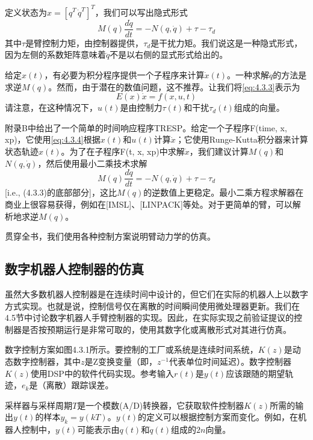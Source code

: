\documentclass[UTF8]{ctexart}
\theoremstyle{definition}
\begin{document}
定义状态为$x = [q^T \, \dot{q}^T]^T$，我们可以写出隐式形式
\begin{equation}\label{eq:4.3.3}
    M(q)\frac{d\dot{q}}{dt} = -N(q, \dot{q}) + \tau - \tau_d
\end{equation}
其中$\tau$是臂控制力矩，由控制器提供，$\tau_d$是干扰力矩。我们说这是一种隐式形式，因为左侧的系数矩阵意味着$\ddot{q}$不是以右侧的显式形式给出的。

给定$x(t)$，有必要为积分程序提供一个子程序来计算$\dot{x}(t)$。一种求解$\ddot{q}$的方法是求逆$M(q)$。然而，由于潜在的数值问题，这不推荐。让我们将\eqref{eq:4.3.3}表示为
\begin{equation}\label{eq:4.3.4}
    E(x)\dot{x} = f(x, u, t)
\end{equation}
请注意，在这种情况下，$u(t)$是由控制力$\tau(t)$和干扰$\tau_d(t)$组成的向量。

附录B中给出了一个简单的时间响应程序TRESP。给定一个子程序F(time, x, xp)，它使用\eqref{eq:4.3.4}根据$x(t)$和$u(t)$计算$\dot{x}$；它使用Runge-Kutta积分器来计算状态轨迹$x(t)$。为了在子程序F(t, x, xp)中求解$\dot{x}$，我们建议计算$M(q)$和$N(q, \dot{q})$，然后使用最小二乘技术求解
\begin{equation}\label{eq:4.3.5}
    M(q)\frac{d\dot{q}}{dt} = -N(q, \dot{q}) + \tau - \tau_d
\end{equation}
[i.e., (4.3.3)的底部部分]，这比$M(q)$的逆数值上更稳定。最小二乘方程求解器在商业上很容易获得，例如在[IMSL]、[LINPACK]等处。对于更简单的臂，可以解析地求逆$M(q)$。

贯穿全书，我们使用各种控制方案说明臂动力学的仿真。

\subsection{数字机器人控制器的仿真}

虽然大多数机器人控制器是在连续时间中设计的，但它们在实际的机器人上以数字方式实现。也就是说，控制信号仅在离散的时间瞬间使用微处理器更新。我们在4.5节中讨论数字机器人手臂控制器的实现。因此，在实际实现之前验证提议的控制器是否按预期运行是非常可取的，使用其数字化或离散形式对其进行仿真。

数字控制方案如图4.3.1所示。要控制的工厂或系统是连续时间系统，$K(z)$是动态数字控制器，其中$z$是Z变换变量（即，$z^{-1}$代表单位时间延迟）。数字控制器$K(z)$使用DSP中的软件代码实现。参考输入$r(t)$是$y(t)$应该跟随的期望轨迹，$e_k$是（离散）跟踪误差。

采样器与采样周期$T$是一个模数(A/D)转换器，它获取软件控制器$K(z)$所需的输出$y(t)$的样本$y_k = y(kT)$。$y(t)$的定义可以根据控制方案而变化。例如，在机器人控制中，$y(t)$可能表示由$q(t)$和$\dot{q}(t)$组成的$2n$向量。
\end{document}
